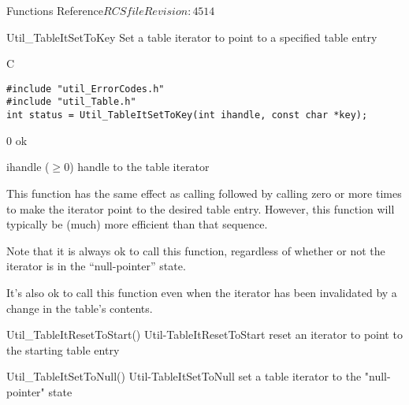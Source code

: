 \begin{cactuspart}{ Functions Reference}{$RCSfile$}{$Revision: 4514 $}
\begin{FunctionDescription}{Util\_TableItSetToKey}
\label{Util-TableItSetToKey}
Set a table iterator to point to a specified table entry

\begin{SynopsisSection}
\begin{Synopsis}{C}
\begin{verbatim}
#include "util_ErrorCodes.h"
#include "util_Table.h"
int status = Util_TableItSetToKey(int ihandle, const char *key);
\end{verbatim}
\end{Synopsis}
\end{SynopsisSection}

\begin{ResultSection}
\begin{Result}{\rm 0}
ok
\end{Result}
\end{ResultSection}

\begin{ParameterSection}
\begin{Parameter}{ihandle ($\ge 0$)}
handle to the table iterator
\end{Parameter}
\end{ParameterSection}

\begin{Discussion}
This function has the same effect as calling 
followed by calling  zero or more times
to make the iterator point to the desired table entry.  However, this
function will typically be (much) more efficient than that sequence.

Note that it is always ok to call this function, regardless of
whether or not the iterator is in the ``null-pointer'' state.

It's also ok to call this function even when the iterator has been
invalidated by a change in the table's contents.
\end{Discussion}

\begin{SeeAlsoSection}
\begin{SeeAlso2} {Util\_TableItResetToStart()} {Util-TableItResetToStart}
reset an iterator to point to the starting table entry
\end{SeeAlso2}
\begin{SeeAlso2} {Util\_TableItSetToNull()} {Util-TableItSetToNull}
set a table iterator to the "null-pointer" state
\end{SeeAlso2}
\end{SeeAlsoSection}


\end{FunctionDescription}
\end{cactuspart}
